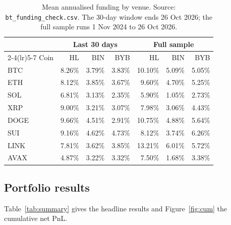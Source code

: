 \documentclass[11pt,a4paper]{article}
\begin{document}
\begin{table}[H]
\centering\small
\caption{Mean annualised funding by venue. Source: \texttt{bt\_funding\_check.csv}. The 30-day window ends 26 Oct 2026; the full sample runs 1 Nov 2024 to 26 Oct 2026.}
\label{tab:fundcheck}
\begin{tabular}{lrrrrrr}
\toprule
 & \multicolumn{3}{c}{Last 30 days} & \multicolumn{3}{c}{Full sample}\\
\cmidrule(lr){2-4}\cmidrule(lr){5-7}
Coin & HL & BIN & BYB & HL & BIN & BYB\\
\midrule
BTC  & 8.26\% & 3.79\% & 3.83\% & 10.10\% & 5.09\% & 5.05\%\\
ETH  & 8.12\% & 3.85\% & 3.67\% & 9.60\% & 4.70\% & 5.25\%\\
SOL  & 6.81\% & 3.13\% & 2.35\% & 5.90\% & 1.05\% & 2.73\%\\
XRP  & 9.00\% & 3.21\% & 3.07\% & 7.98\% & 3.06\% & 4.43\%\\
DOGE & 9.66\% & 4.51\% & 2.91\% & 10.75\% & 4.88\% & 5.64\%\\
SUI  & 9.16\% & 4.62\% & 4.73\% & 8.12\% & 3.74\% & 6.26\%\\
LINK & 7.81\% & 3.62\% & 3.85\% & 13.21\% & 6.01\% & 5.72\%\\
AVAX & 4.87\% & 3.22\% & 3.32\% & 7.50\% & 1.68\% & 3.38\%\\
\bottomrule
\end{tabular}
\end{table}

\subsection{Portfolio results}
Table~\ref{tab:summary} gives the headline results and Figure~\ref{fig:cum} the cumulative net PnL.
\end{document}
